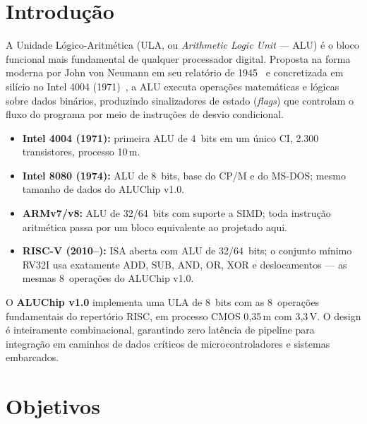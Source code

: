 \documentclass[12pt,a4paper]{article}
\begin{document}
\newpage
\tableofcontents
\listoffigures
\listoftables
\newpage

\section{Introdução}

A Unidade Lógico-Aritmética (ULA, ou \textit{Arithmetic Logic Unit} --- ALU) é o bloco funcional mais fundamental de qualquer processador digital. Proposta na forma moderna por John von Neumann em seu relatório de 1945~\cite{vonneumann1945} e concretizada em silício no Intel 4004 (1971)~\cite{intel4004}, a ALU executa operações matemáticas e lógicas sobre dados binários, produzindo sinalizadores de estado (\textit{flags}) que controlam o fluxo do programa por meio de instruções de desvio condicional.

\begin{unidadebox}
\begin{itemize}[leftmargin=1.5em]
  \item \textbf{Intel 4004 (1971):} primeira ALU de 4~bits em um único CI, 2.300 transistores, processo 10\,\textmu m.
  \item \textbf{Intel 8080 (1974):} ALU de 8~bits, base do CP/M e do MS-DOS; mesmo tamanho de dados do ALUChip v1.0.
  \item \textbf{ARMv7/v8:} ALU de 32/64~bits com suporte a SIMD; toda instrução aritmética passa por um bloco equivalente ao projetado aqui.
  \item \textbf{RISC-V (2010--):} ISA aberta com ALU de 32/64~bits; o conjunto mínimo RV32I usa exatamente ADD, SUB, AND, OR, XOR e deslocamentos --- as mesmas 8~operações do ALUChip v1.0.
\end{itemize}
\end{unidadebox}

O \textbf{ALUChip v1.0} implementa uma ULA de 8~bits com as 8~operações fundamentais do repertório RISC, em processo CMOS 0,35\,\textmu m com 3,3\,V. O design é inteiramente combinacional, garantindo zero latência de pipeline para integração em caminhos de dados críticos de microcontroladores e sistemas embarcados.

\section{Objetivos}
\end{document}
